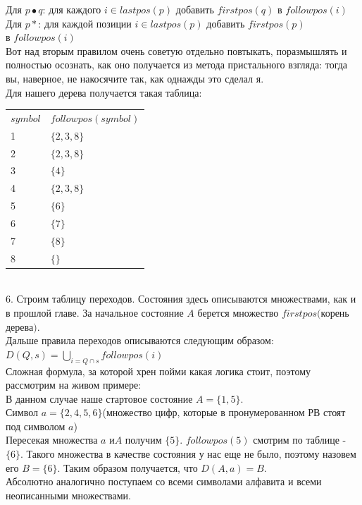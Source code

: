 \documentclass[14pt]{extreport}
\begin{document}
	\hspace*{30pt}Для $p \bullet q$: для каждого $i \in lastpos(p)$ добавить $firstpos(q)$
	в $followpos(i)$\\
	\hspace*{30pt}Для  $p*$: для каждой позиции $i \in lastpos(p)$ добавить $firstpos(p)$\\
	\hspace*{30pt}в $followpos(i)$\\
	Вот над вторым правилом очень советую отдельно повтыкать, поразмышлять и полностью осознать,
	как оно получается из метода пристального взгляда: тогда вы, наверное, не накосячите так,
	как однажды это сделал я.\\
	Для нашего дерева получается такая таблица:\\
		\begin{tabular}{ll}
			 $symbol$ & $followpos(symbol)$ \\
			 1 & $\{2, 3, 8\}$ \\
			 2 & $\{2, 3, 8\}$ \\
			 3 & $\{4\}$ \\
			 4 & $\{2, 3, 8\}$ \\
			 5 & $\{6\}$ \\
			 6 & $\{7\}$\\
			 7 & $\{8\}$\\
			 8 & $\{\}$\\
		\end{tabular}\\
	6. Строим таблицу переходов. Состояния здесь описываются множествами, как и в прошлой главе.
	За начальное состояние $A$ берется множество $firstpos($корень дерева$)$.\\
	Дальше правила переходов описываются следующим образом:\\
	$D(Q, s) = \bigcup\limits_{i=Q \cap s}followpos(i)$\\
	Сложная формула, за которой хрен пойми какая логика стоит, поэтому рассмотрим на живом
	примере:\\
	В данном случае наше стартовое состояние $A=\{1, 5\}$.\\
	Символ $a=\{2, 4, 5, 6\}$(множество	цифр, которые в пронумерованном РВ 
	стоят под символом $a$)\\
	Пересекая множества $a$ и$A$ получим $\{5\}$. $followpos(5)$ смотрим по таблице -
	$\{6\}$. Такого множества в качестве состояния у нас еще не было, поэтому назовем его
	$B=\{6\}$. Таким образом получается, что $D(A, a) = B$.\\
	Абсолютно аналогично поступаем со всеми символами алфавита и всеми неописанными множествами.
\end{document}
